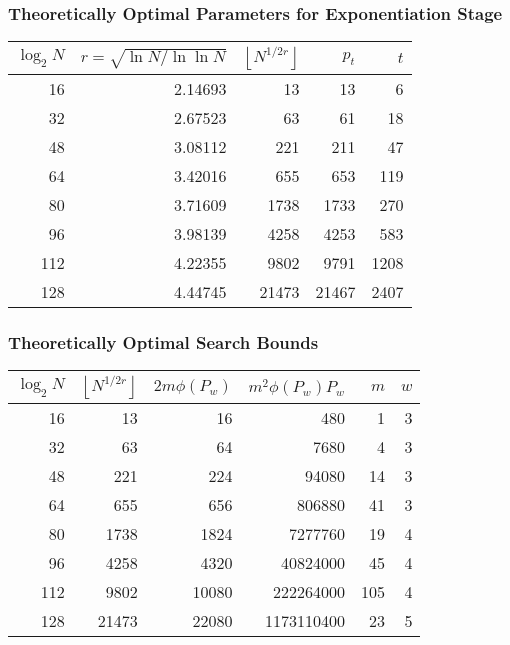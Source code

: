 \documentclass{beamer}
\newcommand{\floor}[1]{\left\lfloor #1 \right\rfloor}
\begin{document}
\begin{frame}
\frametitle{Theoretically Optimal Parameters for Exponentiation Stage}
\begin{table}
\centering
\begin{tabular}{| r | r | r | r | r |}
\hline
$\log_2 N$ & $r = \sqrt{\ln N / \ln \ln N}$ & $\floor{N^{1/2r}}$ & $p_t$ & $t$ \\
\hline
16 & 2.14693 & 13 & 13 & 6 \\
32 & 2.67523 & 63 & 61 & 18 \\
48 & 3.08112 & 221 & 211 & 47 \\
64 & 3.42016 & 655 & 653 & 119 \\
80 & 3.71609 & 1738 & 1733 & 270 \\
96 & 3.98139 & 4258 & 4253 & 583 \\
112 & 4.22355 & 9802 & 9791 & 1208 \\
128 & 4.44745 & 21473 & 21467 & 2407 \\
\hline
\end{tabular}
\end{table}
\end{frame}

\begin{frame}
\frametitle{Theoretically Optimal Search Bounds}
\begin{table}
\centering
\begin{tabular}{| r | r | r | r | r | r |}
\hline
$\log_2 N$ & $\floor{N^{1/2r}}$ & $2m\phi(P_w)$ & $m^2\phi(P_w)P_w$ & $m$ & $w$ \\
\hline
16 & 13 & 16 & 480 & 1 & 3 \\
32 & 63 & 64 & 7680 & 4 & 3 \\
48 & 221 & 224 & 94080 & 14 & 3 \\
64 & 655 & 656 & 806880 & 41 & 3 \\
80 & 1738 & 1824 & 7277760 & 19 & 4 \\
96 & 4258 & 4320 & 40824000 & 45 & 4 \\
112 & 9802 & 10080 & 222264000 & 105 & 4 \\
128 & 21473 & 22080 & 1173110400 & 23 & 5 \\
\hline
\end{tabular}
\end{table}
\end{frame}
\end{document}
